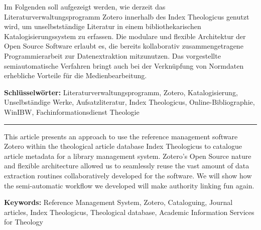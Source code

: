Im Folgenden soll aufgezeigt werden, wie derzeit das
Literaturverwaltungsprogramm Zotero innerhalb des Index Theologicus
genutzt wird, um unselbstständige Literatur in einem bibliothekarischen
Katalogisierungssystem zu erfassen. Die modulare und flexible
Architektur der Open Source Software erlaubt es, die bereits
kollaborativ zusammengetragene Programmierarbeit zur Datenextraktion
mitzunutzen. Das vorgestellte semiautomatische Verfahren bringt auch bei
der Verknüpfung von Normdaten erhebliche Vorteile für die
Medienbearbeitung.

\textbf{Schlüsselwörter:} Literaturverwaltungsprogramm, Zotero,
Katalogisierung, Unselbständige Werke, Aufsatzliteratur, Index
Theologicus, Online-Bibliographie, WinIBW, Fachinformationsdienst
Theologie

\begin{center}\rule{0.5\linewidth}{\linethickness}\end{center}

This article presents an approach to use the reference management
software Zotero within the theological article database Index
Theologicus to catalogue article metadata for a library management
system. Zotero's Open Source nature and flexible architecture allowed us
to seamlessly reuse the vast amount of data extraction routines
collaboratively developed for the software. We will show how the
semi-automatic workflow we developed will make authority linking fun
again.

\textbf{Keywords:} Reference Management System, Zotero, Cataloguing,
Journal articles, Index Theologicus, Theological database, Academic
Information Services for Theology
